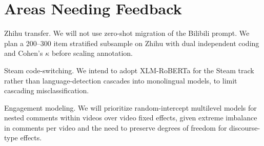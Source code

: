 \documentclass[man, 12pt, mask, floatsintext, nolmodern]{apa7}
\begin{document}
\section{Areas Needing Feedback}

Zhihu transfer. We will not use zero-shot migration of the Bilibili prompt. We plan a 200--300 item stratified subsample on Zhihu with dual independent coding and Cohen's $\kappa$ before scaling annotation.

Steam code-switching. We intend to adopt XLM-RoBERTa for the Steam track rather than language-detection cascades into monolingual models, to limit cascading misclassification.

Engagement modeling. We will prioritize random-intercept multilevel models for nested comments within videos over video fixed effects, given extreme imbalance in comments per video and the need to preserve degrees of freedom for discourse-type effects.

\printbibliography[title={References}]
\end{document}
